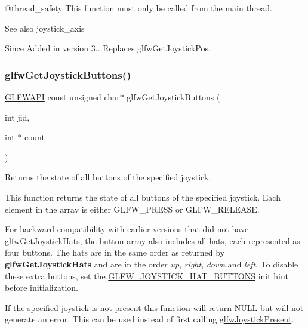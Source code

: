 @thread\+\_\+safety This function must only be called from the main thread.

\begin{DoxySeeAlso}{See also}
joystick\+\_\+axis
\end{DoxySeeAlso}
\begin{DoxySince}{Since}
Added in version 3.. Replaces {\ttfamily glfw\+Get\+Joystick\+Pos}. 
\end{DoxySince}
\mbox{\label{group__input_gad326379e1b7ad94d431403e35cc4d9c3}} 
\subsubsection{\texorpdfstring{glfwGetJoystickButtons()}{glfwGetJoystickButtons()}}
{\footnotesize\ttfamily \mbox{\hyperlink{glfw3_8h_a56da5036b2cc259351ae22fd6439bb47}{G\+L\+F\+W\+A\+PI}} const unsigned char$\ast$ glfw\+Get\+Joystick\+Buttons (\begin{DoxyParamCaption}\item[{int}]{jid,  }\item[{int $\ast$}]{count }\end{DoxyParamCaption})}



Returns the state of all buttons of the specified joystick. 

This function returns the state of all buttons of the specified joystick. Each element in the array is either {\ttfamily G\+L\+F\+W\+\_\+\+P\+R\+E\+SS} or {\ttfamily G\+L\+F\+W\+\_\+\+R\+E\+L\+E\+A\+SE}.

For backward compatibility with earlier versions that did not have \mbox{\hyperlink{group__input_gab2db5ba5f1a85c306a1355bdca52e6be}{glfw\+Get\+Joystick\+Hats}}, the button array also includes all hats, each represented as four buttons. The hats are in the same order as returned by {\bfseries{glfw\+Get\+Joystick\+Hats}} and are in the order {\itshape up}, {\itshape right}, {\itshape down} and {\itshape left}. To disable these extra buttons, set the \mbox{\hyperlink{group__init_gab9c0534709fda03ec8959201da3a9a18}{G\+L\+F\+W\+\_\+\+J\+O\+Y\+S\+T\+I\+C\+K\+\_\+\+H\+A\+T\+\_\+\+B\+U\+T\+T\+O\+NS}} init hint before initialization.

If the specified joystick is not present this function will return {\ttfamily N\+U\+LL} but will not generate an error. This can be used instead of first calling \mbox{\hyperlink{group__input_gacb1b7dfd79df673d48814c06fc436eff}{glfw\+Joystick\+Present}}.


